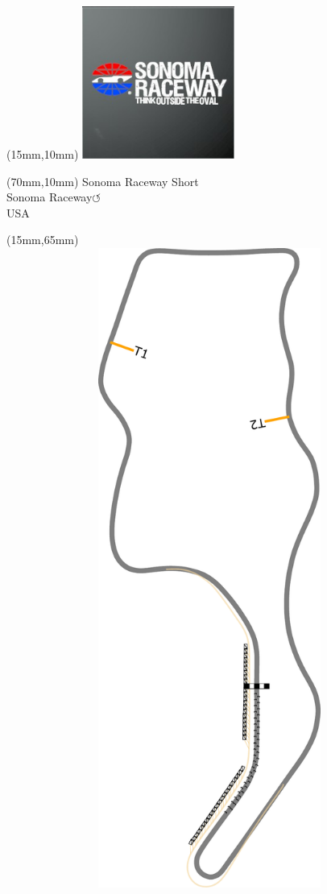 \null\newpage
\begin{textblock*}{50mm}(15mm,10mm)%
\includegraphics[width=50mm]{LG/2015-05-20_00096.png}
\end{textblock*}
\begin{textblock*}{130mm}(70mm,10mm)%
{\fontsize{20}{20}\selectfont Sonoma Raceway Short\\}
{\fontsize{16}{16}\selectfont Sonoma Raceway\hfill \huge$\circlearrowleft$\\}
{\fontsize{12}{12}\selectfont USA\\}
\end{textblock*}
\begin{textblock*}{185mm}(15mm,65mm)%
\centering
\mbox{\includegraphics[width=185mm,height=210mm,keepaspectratio]{PT/SORASH.pdf}}
\end{textblock*}
